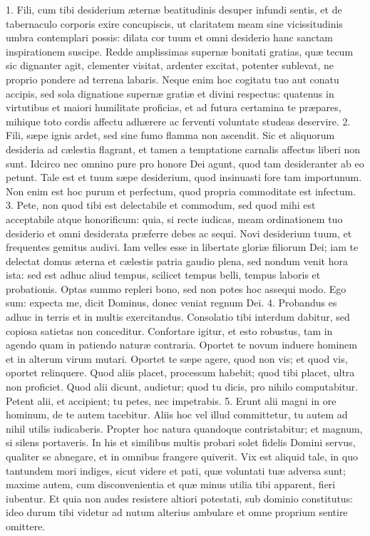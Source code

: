 1. Fili, cum tibi desiderium æternæ beatitudinis desuper infundi sentis, et de tabernaculo corporis exire concupiscis, ut claritatem meam sine vicissitudinis umbra contemplari possis: dilata cor tuum et omni desiderio hanc sanctam inspirationem suscipe. Redde amplissimas supernæ bonitati gratias, quæ tecum sic dignanter agit, clementer visitat, ardenter excitat, potenter sublevat, ne proprio pondere ad terrena labaris. Neque enim hoc cogitatu tuo aut conatu accipis, sed sola dignatione supernæ gratiæ et divini respectus: quatenus in virtutibus et maiori humilitate proficias, et ad futura certamina te præpares, mihique toto cordis affectu adhærere ac ferventi voluntate studeas deservire.
2. Fili, sæpe ignis ardet, sed sine fumo flamma non ascendit. Sic et aliquorum desideria ad cælestia flagrant, et tamen a temptatione carnalis affectus liberi non sunt. Idcirco nec omnino pure pro honore Dei agunt, quod tam desideranter ab eo petunt. Tale est et tuum sæpe desiderium, quod insinuasti fore tam importunum. Non enim est hoc purum et perfectum, quod propria commoditate est infectum.
3. Pete, non quod tibi est delectabile et commodum, sed quod mihi est acceptabile atque honorificum: quia, si recte iudicas, meam ordinationem tuo desiderio et omni desiderata præferre debes ac sequi. Novi desiderium tuum, et frequentes gemitus audivi. Iam velles esse in libertate gloriæ filiorum Dei; iam te delectat domus æterna et cælestis patria gaudio plena, sed nondum venit hora ista: sed est adhuc aliud tempus, scilicet tempus belli, tempus laboris et probationis. Optas summo repleri bono, sed non potes hoc assequi modo. Ego sum: expecta me, dicit Dominus, donec veniat regnum Dei.
4. Probandus es adhuc in terris et in multis exercitandus. Consolatio tibi interdum dabitur, sed copiosa satietas non conceditur. Confortare igitur, et esto robustus, tam in agendo quam in patiendo naturæ contraria. Oportet te novum induere hominem et in alterum virum mutari. Oportet te sæpe agere, quod non vis; et quod vis, oportet relinquere. Quod aliis placet, processum habebit; quod tibi placet, ultra non proficiet. Quod alii dicunt, audietur; quod tu dicis, pro nihilo computabitur. Petent alii, et accipient; tu petes, nec impetrabis.
5. Erunt alii magni in ore hominum, de te autem tacebitur. Aliis hoc vel illud committetur, tu autem ad nihil utilis iudicaberis. Propter hoc natura quandoque contristabitur; et magnum, si silens portaveris. In his et similibus multis probari solet fidelis Domini servus, qualiter se abnegare, et in omnibus frangere quiverit. Vix est aliquid tale, in quo tantundem mori indiges, sicut videre et pati, quæ voluntati tuæ adversa sunt; maxime autem, cum disconvenientia et quæ minus utilia tibi apparent, fieri iubentur. Et quia non audes resistere altiori potestati, sub dominio constitutus: ideo durum tibi videtur ad nutum alterius ambulare et omne proprium sentire omittere.
